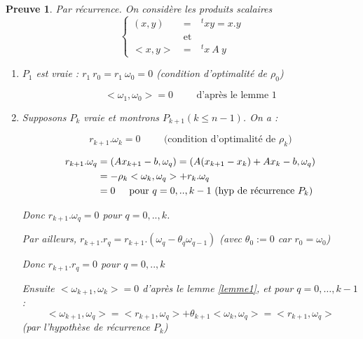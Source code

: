 \documentclass[a4paper,11pt]{article}
\newcommand{\tpo}[1]{\,^t#1}
\theoremstyle{plain} %
\newtheorem{preuve}{Preuve}
\begin{document}
\begin{preuve}
    Par récurrence. On considère les produits scalaires 
    \[
        \left\lbrace
        \begin{array}{ccc}
            (x,y) & = & \tpo xy = x.y \\
            & \text{et} & \\
            <x,y> \: & = & \tpo x \: A \: y
        \end{array}
        \right.
    \]

    \begin{enumerate}[label=•]
        \item $P_1$ est vraie : $r_1 \: r_0 = r_1 \: \omega_0 = 0$ (condition d'optimalité de $\rho_0$)

            \[
                < \omega_1 , \omega_0 > = 0 \hspace{1cm} \text{d'après le lemme 1}
            \]

        \item Supposons $P_k$ vraie et montrons $P_{k+1} (k \leq n-1)$. On a :

            \[
                r_{k+1}.\omega_k = 0 \hspace{1cm} \text{(condition d'optimalité de $\rho_k$)}
            \]

            \begin{align*}
                r_{k+1}.\omega_q & = (Ax_{k+1} - b, \omega_q) = \left(A(x_{k+1} - x_k) + Ax_k - b, \omega_q \right) \\
                & = - \rho_k <\omega_k,\omega_q> + r_k . \omega_q \\
                & = 0 \hspace{0.5cm} \text{pour $q=0,..,k-1$ (hyp de récurrence $P_k$)}
            \end{align*}

            Donc $r_{k+1}.\omega_q = 0$ pour $q=0,..,k$.

            Par ailleurs, $r_{k+1}.r_q = r_{k+1}.(\omega_q - \theta_q \omega_{q-1})$ \hspace{0.3cm} (avec $\theta_0 := 0$ car $r_0 = \omega_0$)

            \vspace{0.4cm}
            Donc $r_{k+1}.r_q = 0$ pour $q=0,..,k$

            \vspace{0.4cm}
            Ensuite $<\omega_{k+1},\omega_k> = 0$ d'après le lemme \ref{lemme1}, et pour
            $q=0,\dots,k-1$ :
            \[
                <\omega_{k+1},\omega_q> = <r_{k+1},\omega_q> + \theta_{k+1} <\omega_k,\omega_q> = <r_{k+1},\omega_q>
            \]
            (par l'hypothèse de récurrence $P_k$)


\end{enumerate}
\end{preuve}
\end{document}
